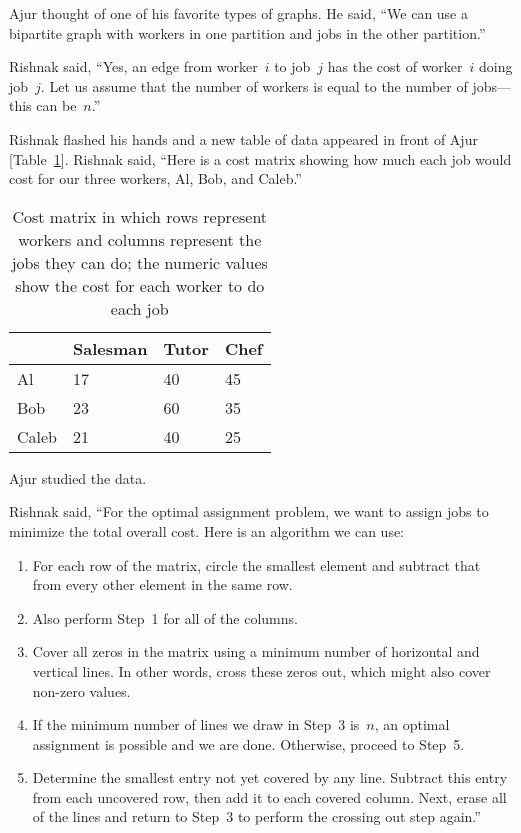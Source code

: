 Ajur thought of one of his favorite types of graphs. He said, ``We can use a bipartite graph with workers in one partition and jobs in the other partition.''

Rishnak said, ``Yes, an edge from worker~$i$ to job~$j$ has the cost of worker~$i$ doing job~$j$.
Let us assume that the number of workers is equal to the number of jobs---this can be~$n$.''

Rishnak flashed his hands and a new table of data appeared in front of Ajur [Table~\ref{16t3}]. Rishnak said, ``Here is a cost matrix showing how much each job would cost for our three workers, Al, Bob, and Caleb.'' 

\begin{table}
\begin{center}
\begin{tabular}{ ||p{2cm}||p{2cm}||p{1.5cm} ||p{1.5cm}|| }
 \hline
 
  & Salesman&Tutor&Chef\\
 \hline
 Al  & 17   &40&45\\
 Bob& 23&60&35\\
 Caleb&21&40&25\\

 
 \hline
\end{tabular}
\caption{Cost matrix in which rows represent workers and columns represent the jobs they can do; the numeric values show the cost for each worker to do each job}\label{16t3}
\end{center}
\end{table}

Ajur studied the data.

Rishnak said, ``For the optimal assignment problem, we want to assign jobs to minimize the total overall cost. Here is an algorithm we can use:

\begin{enumerate}
\item For each row of the matrix, circle the smallest element and subtract that from every other element in the same row.
\item Also perform Step~1 for all of the columns.
\item Cover all zeros in the matrix using a minimum number of horizontal and vertical lines. In other words, cross these zeros out, which might also cover non-zero values.
\item If the minimum number of lines we draw in Step~3 is~$n$, an optimal assignment is possible and we are done. Otherwise, proceed to Step~5.
\item Determine the smallest entry not yet covered by any line. Subtract this entry from each uncovered row, then add it to each covered column. Next, erase all of the lines and return to Step~3 to perform the crossing out step again.''
\end{enumerate}

